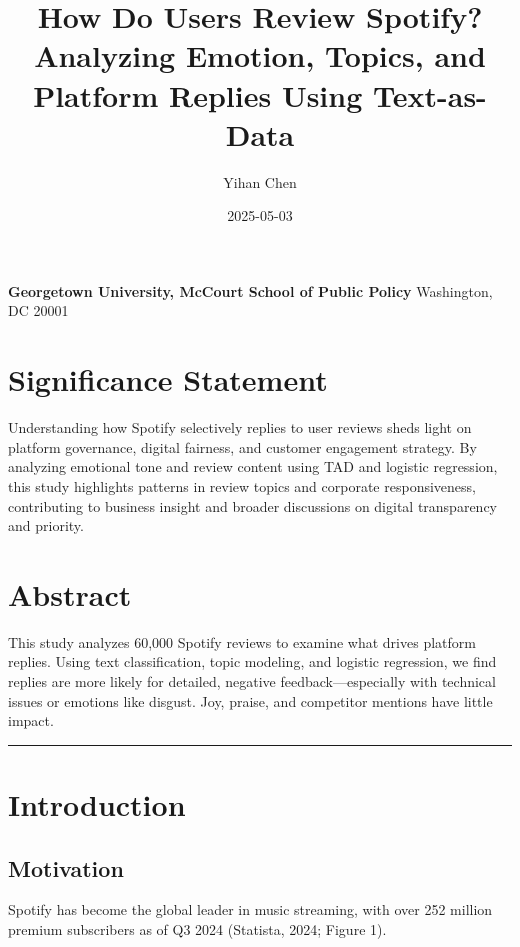 \documentclass[
  11pt,
]{article}
\title{How Do Users Review Spotify? Analyzing Emotion, Topics, and
Platform Replies Using Text-as-Data}
\author{Yihan Chen}
\date{2025-05-03}
\begin{document}
\maketitle

{
\setcounter{tocdepth}{3}
\tableofcontents
}
\begin{center}
\textbf{Georgetown University, McCourt School of Public Policy}  
Washington, DC 20001  
\end{center}

\section*{Significance Statement}

Understanding how Spotify selectively replies to user reviews sheds
light on platform governance, digital fairness, and customer engagement
strategy. By analyzing emotional tone and review content using TAD and
logistic regression, this study highlights patterns in review topics and
corporate responsiveness, contributing to business insight and broader
discussions on digital transparency and priority.

\section*{Abstract}

This study analyzes 60,000 Spotify reviews to examine what drives
platform replies. Using text classification, topic modeling, and
logistic regression, we find replies are more likely for detailed,
negative feedback---especially with technical issues or emotions like
disgust. Joy, praise, and competitor mentions have little impact.

\begin{center}\rule{0.5\linewidth}{0.5pt}\end{center}

\hypertarget{introduction}{%
\section{Introduction}\label{introduction}}

\hypertarget{motivation}{%
\subsection{Motivation}\label{motivation}}

Spotify has become the global leader in music streaming, with over 252
million premium subscribers as of Q3 2024 (Statista, 2024; Figure 1).
\end{document}
